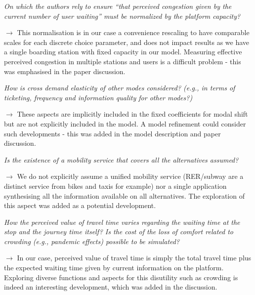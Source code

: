 \documentclass[10pt]{article}
\begin{document}

\noindent\textit{On which the authors rely to ensure ``that perceived congestion given by the current number of user waiting'' must be normalized by the platform capacity?}

\noindent$\rightarrow$ This normalisation is in our case a convenience rescaling to have comparable scales for each discrete choice parameter, and does not impact results as we have a single boarding station with fixed capacity in our model. Measuring effective perceived congestion in multiple stations and users is a difficult problem - this was emphasised in the paper discussion.

\medskip

\noindent\textit{How is cross demand elasticity of other modes considered? (e.g., in terms of ticketing, frequency and information quality for other modes?)}

\noindent$\rightarrow$ These aspects are implicitly included in the fixed coefficients for modal shift but are not explicitly included in the model. A model refinement could consider such developments - this was added in the model description and paper discussion.

\medskip

\noindent\textit{Is the existence of a mobility service that covers all the alternatives assumed?}

\noindent$\rightarrow$ We do not explicitly assume a unified mobility service (RER/subway are a distinct service from bikes and taxis for example) nor a single application synthesising all the information available on all alternatives. The exploration of this aspect was added as a potential development.

\medskip

\noindent\textit{How the perceived value of travel time varies regarding the waiting time at the stop and the journey time itself? Is the cost of the loss of comfort related to crowding (e.g., pandemic effects) possible to be simulated?}

\noindent$\rightarrow$ In our case, perceived value of travel time is simply the total travel time plus the expected waiting time given by current information on the platform. Exploring diverse functions and aspects for this disutility such as crowding is indeed an interesting development, which was added in the discussion.
\end{document}

